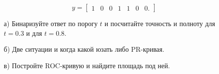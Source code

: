 \documentclass[12pt, a4paper, oneside]{article}
\begin{document}
$$y = \begin{bmatrix} 1 & 0 &0 & 1 &1 & 0 & 0. \end{bmatrix}$$

\begin{enumerate}
	\item[а)]  Бинаризуйте ответ по порогу $t$ и посчитайте точность и полноту для $t = 0.3$ и для  $t = 0.8$.
	\item[б)]  Две ситуации и когда какой юзать либо PR-кривая. 
	\item[в)]  Постройте ROC-кривую и найдите площадь под ней. 
 
\end{enumerate}

\end{document}
